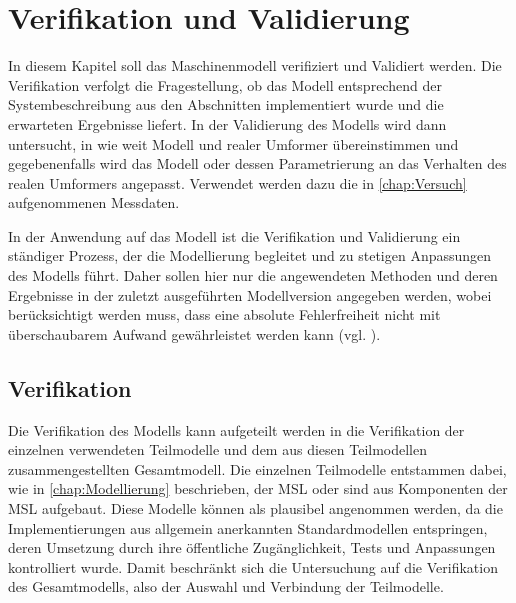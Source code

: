 \chapter{Verifikation und Validierung}
\label{chap:VerfikationValidierung}
In diesem Kapitel soll das Maschinenmodell verifiziert und Validiert werden. Die Verifikation verfolgt die Fragestellung, ob das Modell entsprechend der Systembeschreibung aus den Abschnitten  implementiert wurde und die erwarteten Ergebnisse liefert. In der Validierung des Modells wird dann untersucht, in wie weit Modell und realer Umformer übereinstimmen und gegebenenfalls wird das Modell oder dessen Parametrierung an das Verhalten des realen Umformers angepasst. Verwendet werden dazu die in \cref{chap:Versuch} aufgenommenen Messdaten. 

In der Anwendung auf das Modell ist die Verifikation und Validierung ein ständiger Prozess, der die Modellierung begleitet und zu stetigen Anpassungen des Modells führt. Daher sollen hier nur die angewendeten Methoden und deren Ergebnisse in der zuletzt ausgeführten Modellversion angegeben werden, wobei berücksichtigt werden muss, dass eine absolute Fehlerfreiheit nicht mit überschaubarem Aufwand gewährleistet werden kann (vgl. \cite[S.~14ff.]{rabeVerifikationUndValidierung2008}).
 
\section{Verifikation}
\label{sec:Verifkation}
Die Verifikation des Modells kann aufgeteilt werden in die Verifikation der einzelnen verwendeten Teilmodelle und dem aus diesen Teilmodellen zusammengestellten Gesamtmodell. Die einzelnen Teilmodelle entstammen dabei, wie in \cref{chap:Modellierung} beschrieben, der MSL oder sind aus Komponenten der MSL aufgebaut. Diese Modelle können als plausibel angenommen werden, da die Implementierungen aus allgemein anerkannten Standardmodellen entspringen, deren Umsetzung durch ihre öffentliche Zugänglichkeit, Tests und Anpassungen kontrolliert wurde. Damit beschränkt sich die Untersuchung auf die Verifikation des Gesamtmodells, also der Auswahl und Verbindung der Teilmodelle. 

